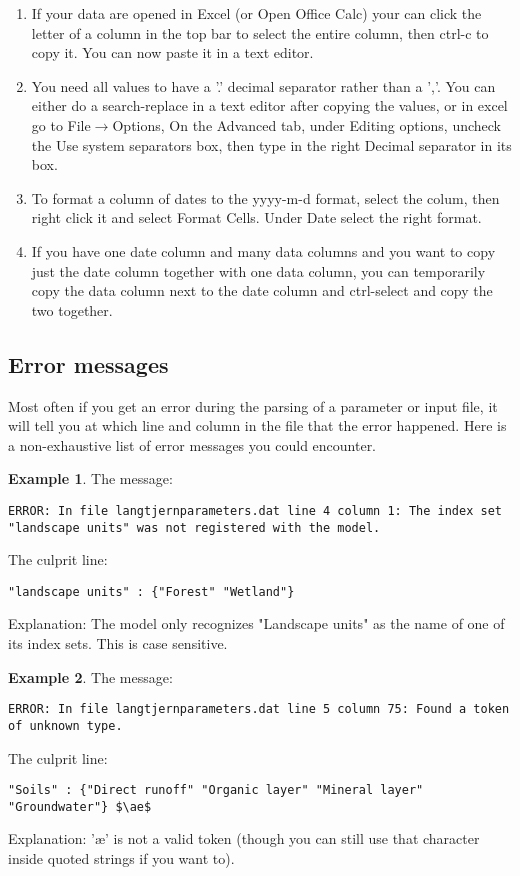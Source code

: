 \documentclass[11pt]{article}
\theoremstyle{definition}
\newtheorem{myexample}{Example}
\newenvironment{example}%
  {\begin{lrbox}{\examplebox}%
   \begin{minipage}{\dimexpr\linewidth-2\fboxsep}
   \begin{myexample}}%
  {\end{myexample}%
   \end{minipage}%
   \end{lrbox}%
   \begin{trivlist}
     \item[]\colorbox{silver}{\usebox\examplebox}
   \end{trivlist}}
\begin{document}
\begin{enumerate}[i]
\item If your data are opened in Excel (or Open Office Calc) your can click the letter of a column in the top bar to select the entire column, then ctrl-c to copy it. You can now paste it in a text editor.
\item You need all values to have a '.' decimal separator rather than a ','. You can either do a search-replace in a text editor after copying the values, or in excel go to File$\rightarrow$Options, On the Advanced tab, under Editing options, uncheck the Use system separators box, then type in the right Decimal separator in its box.
\item To format a column of dates to the yyyy-m-d format, select the colum, then right click it and select Format Cells. Under Date select the right format.
\item If you have one date column and many data columns and you want to copy just the date column together with one data column, you can temporarily copy the data column next to the date column and ctrl-select and copy the two together.
\end{enumerate}

\subsection{Error messages}

Most often if you get an error during the parsing of a parameter or input file, it will tell you at which line and column in the file that the error happened. Here is a non-exhaustive list of error messages you could encounter.

\begin{example}
The message:
\begin{lstlisting}
ERROR: In file langtjernparameters.dat line 4 column 1: The index set "landscape units" was not registered with the model.
\end{lstlisting}
The culprit line:
\begin{lstlisting}
"landscape units" : {"Forest" "Wetland"}
\end{lstlisting}
Explanation: The model only recognizes "Landscape units" as the name of one of its index sets. This is case sensitive.
\end{example}

\begin{example}
The message:
\begin{lstlisting}
ERROR: In file langtjernparameters.dat line 5 column 75: Found a token of unknown type.
\end{lstlisting}
The culprit line:
\begin{lstlisting}[mathescape]
"Soils" : {"Direct runoff" "Organic layer" "Mineral layer" "Groundwater"} $\ae$
\end{lstlisting}
Explanation: '\ae' is not a valid token (though you can still use that character inside quoted strings if you want to).
\end{example}
\end{document}
